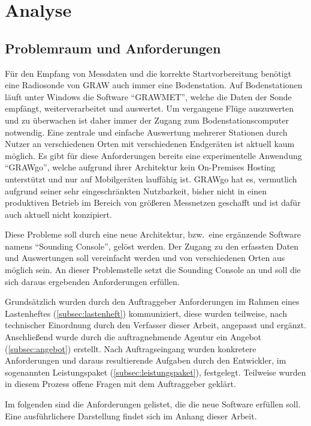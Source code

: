 \section{Analyse}

\subsection{Problemraum und Anforderungen}
Für den Empfang von Messdaten und die korrekte Startvorbereitung benötigt eine Radiosonde von GRAW auch immer eine Bodenstation.
Auf Bodenstationen läuft unter Windows die Software \enquote{GRAWMET}\cite{grawmet}, welche die Daten der Sonde empfängt, weiterverarbeitet und auswertet.
Um vergangene Flüge auszuwerten und zu überwachen ist daher immer der Zugang zum Bodenstationscomputer notwendig.
Eine zentrale und einfache Auswertung mehrerer Stationen durch Nutzer an verschiedenen Orten mit verschiedenen Endgeräten ist aktuell kaum möglich.
Es gibt für diese Anforderungen bereits eine experimentelle Anwendung \enquote{GRAWgo}\cite{grawgo}, welche aufgrund ihrer Architektur kein On-Premises Hosting unterstützt und nur auf Mobilgeräten lauffähig ist.
GRAWgo hat es, vermutlich aufgrund seiner sehr eingeschränkten Nutzbarkeit, bisher nicht in einen produktiven Betrieb im Bereich von größeren Messnetzen geschafft und ist dafür auch aktuell nicht konzipiert.

Diese Probleme soll durch eine neue Architektur, bzw.\ eine ergänzende Software namens \enquote{Sounding Console}, gelöst werden.
Der Zugang zu den erfassten Daten und Auswertungen soll vereinfacht werden und von verschiedenen Orten aus möglich sein.
An dieser Problemstelle setzt die Sounding Console an und soll die sich daraus ergebenden Anforderungen erfüllen.

Grundsätzlich wurden durch den Auftraggeber Anforderungen im Rahmen eines Lastenheftes (\ref{subsec:lastenheft}) kommuniziert, diese wurden teilweise, nach technischer Einordnung durch den Verfasser dieser Arbeit, angepasst und ergänzt.
Anschließend wurde durch die auftragnehmende Agentur ein Angebot (\ref{subsec:angebot}) erstellt.
Nach Auftragseingang wurden konkretere Anforderungen und daraus resultierende Aufgaben durch den Entwickler, im sogenannten Leistungspaket (\ref{subsec:leistungspaket}), festgelegt.
Teilweise wurden in diesem Prozess offene Fragen mit dem Auftraggeber geklärt.

Im folgenden sind die Anforderungen gelistet, die die neue Software erfüllen soll.
Eine ausführlichere Darstellung findet sich im Anhang dieser Arbeit.
\newpage

